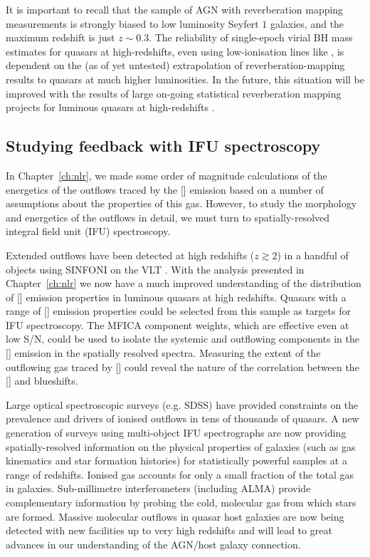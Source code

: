 It is important to recall that the sample of AGN with reverberation mapping measurements is strongly biased to low luminosity Seyfert $1$ galaxies, and the maximum redshift is just $z\sim0.3$.
The reliability of single-epoch virial BH mass estimates for quasars at high-redshifts, even using low-ionisation lines like \hbns, is dependent on the (as of yet untested) extrapolation of reverberation-mapping results to quasars at much higher luminosities. 
In the future, this situation will be improved with the results of large on-going statistical reverberation mapping projects for luminous quasars at high-redshifts \citep[e.g.][]{shen15,kingoz15}. 

\subsection{Studying feedback with IFU spectroscopy}

In Chapter~\ref{ch:nlr}, we made some order of magnitude calculations of the energetics of the outflows traced by the [] emission based on a number of assumptions about the properties of this gas. 
However, to study the morphology and energetics of the outflows in detail, we must turn to spatially-resolved integral field unit (IFU) spectroscopy.

Extended outflows have been detected at high redshifts ($z\gtrsim2$) in a handful of objects using SINFONI on the VLT \citep[e.g.][]{carniani15}. 
With the analysis presented in Chapter~\ref{ch:nlr} we now have a much improved understanding of the distribution of [] emission properties in luminous quasars at high redshifts. 
Quasars with a range of [] emission properties could be selected from this sample as targets for IFU spectroscopy. 
The MFICA component weights, which are effective even at low S/N, could be used to isolate the systemic and outflowing components in the [] emission in the spatially resolved spectra.
Measuring the extent of the outflowing gas traced by [] could reveal the nature of the correlation between the [] and  blueshifts.

Large optical spectroscopic surveys (e.g. SDSS) have provided constraints on the prevalence and drivers of ionised outflows in tens of thousands of quasars.
A new generation of surveys using multi-object IFU spectrographs \citep[including KMOS, MaNGA and SAMI;][]{croom12,sharples13,bundy15} are now providing spatially-resolved information on the physical properties of galaxies (such as gas kinematics and star formation histories) for statistically powerful samples at a range of redshifts. 
Ionised gas accounts for only a small fraction of the total gas in galaxies.
Sub-millimetre interferometers (including ALMA) provide complementary information by probing the cold, molecular gas from which stars are formed. 
Massive molecular outflows in quasar host galaxies are now being detected with new facilities up to very high redshifts \citep[e.g.][]{maiolino12} and will lead to great advances in our understanding of the AGN/host galaxy connection. 


 

 







